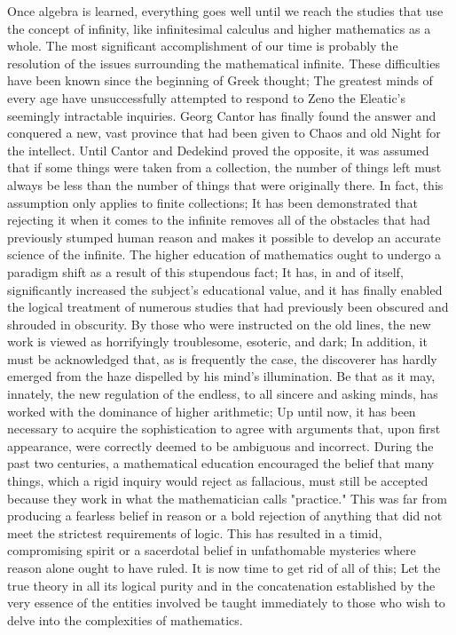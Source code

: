 \documentclass[a4paper,12pt]{book}[2004/02/16]
\theoremstyle{ilemma}
\theoremstyle{itheorem}
\theoremstyle{iother}
\theoremstyle{icorollary}
\theoremstyle{numcorollary}
\theoremstyle{idefinition}
\begin{document}
Once algebra is learned, everything goes well until we reach the studies that use the concept of infinity, like infinitesimal calculus and higher mathematics as a whole. The most significant accomplishment of our time is probably the resolution of the issues surrounding the mathematical infinite.
These difficulties have been known since the beginning of Greek thought; The greatest minds of every age have unsuccessfully attempted to respond to Zeno the Eleatic's seemingly intractable inquiries. Georg Cantor has finally found the answer and conquered a new, vast province that had been given to Chaos and old Night for the intellect. Until Cantor and Dedekind proved the opposite, it was assumed that if some things were taken from a collection, the number of things left must always be less than the number of things that were originally there. In fact, this assumption only applies to finite collections; It has been demonstrated that rejecting it when it comes to the infinite removes all of the obstacles that had previously stumped human reason and makes it possible to develop an accurate science of the infinite. The higher education of mathematics ought to undergo a paradigm shift as a result of this stupendous fact; It has, in and of itself, significantly increased the subject's educational value, and it has finally enabled the logical treatment of numerous studies that had previously been obscured and shrouded in obscurity. By those
who were instructed on the old lines, the new work is viewed as
horrifyingly troublesome, esoteric, and dark; In addition, it must be acknowledged that, as is frequently the case, the discoverer has hardly emerged from the haze dispelled by his mind's illumination.
Be that as it may, innately, the new regulation of the endless, to all sincere and
asking minds, has worked with the dominance of higher arithmetic;
Up until now, it has been necessary to acquire the sophistication to agree with arguments that, upon first appearance, were correctly deemed to be ambiguous and incorrect. During the past two centuries, a mathematical education encouraged the belief that many things, which a rigid inquiry would reject as fallacious, must still be accepted because they work in what the mathematician calls "practice." This was far from producing a fearless belief in reason or a bold rejection of anything that did not meet the strictest requirements of logic. This has resulted in a timid, compromising spirit or a sacerdotal belief in unfathomable mysteries where reason alone ought to have ruled. It is now time to get rid of all of this; Let the true theory in all its logical purity and in the concatenation established by the very essence of the entities involved be taught immediately to those who wish to delve into the complexities of mathematics.
\end{document}
